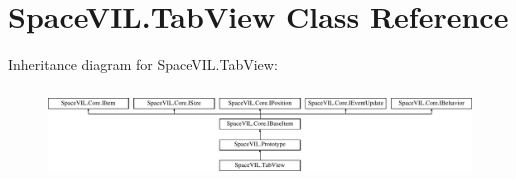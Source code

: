 \hypertarget{class_space_v_i_l_1_1_tab_view}{}\section{Space\+V\+I\+L.\+Tab\+View Class Reference}
\label{class_space_v_i_l_1_1_tab_view}
Inheritance diagram for Space\+V\+I\+L.\+Tab\+View\+:\begin{figure}[H]
\begin{center}
\leavevmode
\includegraphics[height=2.421622cm]{class_space_v_i_l_1_1_tab_view}
\end{center}
\end{figure}
